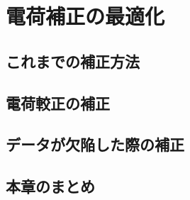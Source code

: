 \chapter{電荷補正の最適化}

\section{これまでの補正方法}

\section{電荷較正の補正}

\section{データが欠陥した際の補正}

\section{本章のまとめ}

\newpage
